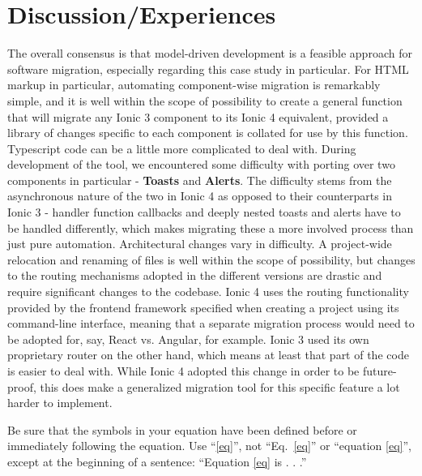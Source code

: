\documentclass[conference]{IEEEtran}
\begin{document}
\section{Discussion/Experiences}
The overall consensus is that model-driven development is a feasible approach
for software migration, especially regarding this case study in particular.
\newline \newline
For HTML markup in particular, automating component-wise migration is remarkably simple, and it
is well within the scope of possibility to create a general function that will migrate any Ionic
3 component to its Ionic 4 equivalent, provided a library of changes specific to each component
is collated for use by this function.
\newline \newline
Typescript code can be a little more complicated to deal with. During development of the tool,
we encountered some difficulty with porting over two components in particular - \textbf{Toasts} and
\textbf{Alerts}. The difficulty stems from the asynchronous nature of the two in Ionic 4 as opposed to their
counterparts in Ionic 3 - handler function callbacks and deeply nested toasts and alerts have to be handled differently,
which makes migrating these a more involved process than just pure automation.
\newline \newline
Architectural changes vary in difficulty. A project-wide relocation and renaming of files is well within the
scope of possibility, but changes to the routing mechanisms adopted in the different versions are drastic and
require significant changes to the codebase. Ionic 4 uses the routing functionality provided by the frontend framework
specified when creating a project using its command-line interface, meaning that a separate migration process would need
to be adopted for, say, React vs. Angular, for example. Ionic 3 used its own proprietary router on the other hand, which means
at least that part of the code is easier to deal with. While Ionic 4 adopted this change in order to be future-proof, this does
make a generalized migration tool for this specific feature a lot harder to implement.

Be sure that the 
symbols in your equation have been defined before or immediately following 
the equation. Use ``\eqref{eq}'', not ``Eq.~\eqref{eq}'' or ``equation \eqref{eq}'', except at 
the beginning of a sentence: ``Equation \eqref{eq} is . . .''
\end{document}
